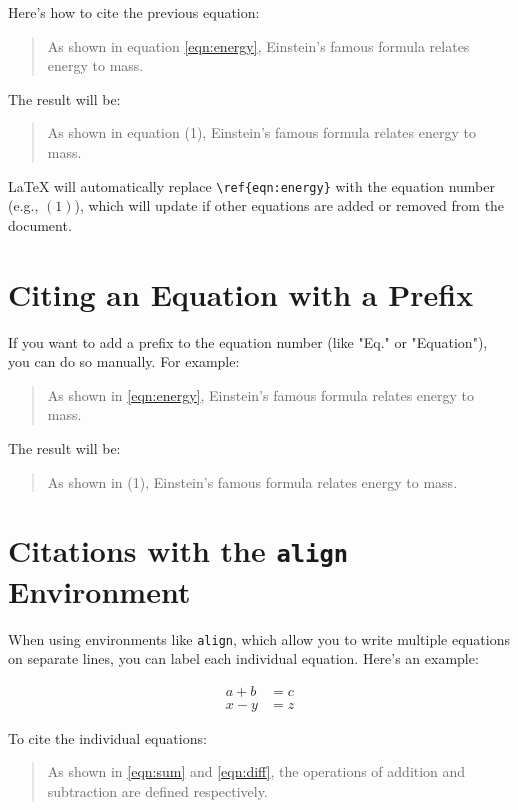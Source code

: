 Here’s how to cite the previous equation:

\begin{quote}
	As shown in equation \ref{eqn:energy}, Einstein’s famous formula relates energy to mass.
\end{quote}

The result will be:

\begin{quote}
	As shown in equation (1), Einstein’s famous formula relates energy to mass.
\end{quote}

LaTeX will automatically replace \verb|\ref{eqn:energy}| with the equation number (e.g., \((1)\)), which will update if other equations are added or removed from the document.

\section{Citing an Equation with a Prefix}

If you want to add a prefix to the equation number (like "Eq." or "Equation"), you can do so manually. For example:

\begin{quote}
	As shown in  \ref{eqn:energy}, Einstein’s famous formula relates energy to mass.
\end{quote}

The result will be:

\begin{quote}
	As shown in  (1), Einstein’s famous formula relates energy to mass.
\end{quote}

\section{Citations with the \texttt{align} Environment}

When using environments like \verb|align|, which allow you to write multiple equations on separate lines, you can label each individual equation. Here’s an example:

\begin{align}
	a + b &= c \label{eqn:sum} \\
	x - y &= z \label{eqn:diff}
\end{align}

To cite the individual equations:

\begin{quote}
	As shown in \ref{eqn:sum} and \ref{eqn:diff}, the operations of addition and subtraction are defined respectively.
\end{quote}

